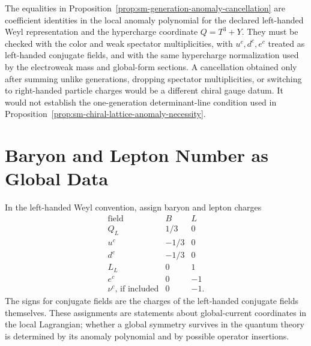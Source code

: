 \begin{remark}
\label{rem:sm-anomaly-sums-check}
The equalities in Proposition~\ref{prop:sm-generation-anomaly-cancellation}
are coefficient identities in the local anomaly polynomial for the declared
left-handed Weyl representation and the hypercharge coordinate \(Q=T^3+Y\).
They must be checked with the color and weak spectator multiplicities, with
\(u^c,d^c,e^c\) treated as left-handed conjugate fields, and with the same
hypercharge normalization used by the electroweak mass and global-form
sections.  A cancellation obtained only after summing unlike generations,
dropping spectator multiplicities, or switching to right-handed particle
charges would be a different chiral gauge datum.  It would not establish the
one-generation determinant-line condition used in
Proposition~\ref{prop:sm-chiral-lattice-anomaly-necessity}.
\end{remark}

\section{Baryon and Lepton Number as Global Data}

\begin{definition}
\label{def:sm-b-l-charges}
In the left-handed Weyl convention, assign baryon and lepton charges
\[
\begin{array}{c|cc}
  \text{field} & B & L \\ \hline
  Q_L & 1/3 & 0\\
  u^c & -1/3 & 0\\
  d^c & -1/3 & 0\\
  L_L & 0 & 1\\
  e^c & 0 & -1\\
  \nu^c\text{, if included} & 0 & -1 .
\end{array}
\]
The signs for conjugate fields are the charges of the left-handed conjugate
fields themselves.  These assignments are statements about global-current
coordinates in the local Lagrangian; whether a global symmetry survives in
the quantum theory is determined by its anomaly polynomial and by possible
operator insertions.
\end{definition}

